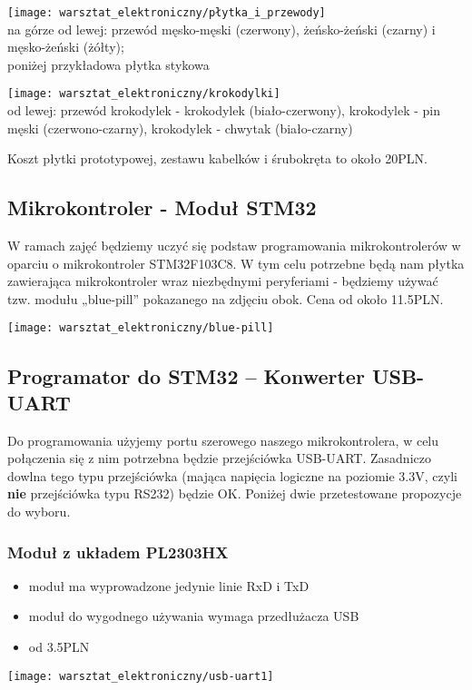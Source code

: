 \documentclass{pdfBooklets}
\newcommand\wada{\item[\textbf{\ttfamily -}]}
\newcommand\info{\item[\textbf{\ttfamily *}]}
\begin{document}
	\vspace{12pt}
		\parbox[c]{0.45\textwidth}{
			\texttt{[image: warsztat\_elektroniczny/płytka\_i\_przewody]}\footnotesize
			\\na górze od lewej: przewód męsko-męski (czerwony), żeńsko-żeński (czarny) i męsko-żeński (żółty);
			\\poniżej przykładowa płytka stykowa
		}
		\parbox[c]{0.45\textwidth}{
			\texttt{[image: warsztat\_elektroniczny/krokodylki]}\footnotesize
			\\od lewej: przewód krokodylek - krokodylek (biało-czerwony), krokodylek - pin męski (czerwono-czarny), krokodylek - chwytak (biało-czarny)
		}
	\vspace{12pt}
	
	Koszt płytki prototypowej, zestawu kabelków i śrubokręta to około 20PLN.

\subsection{Mikrokontroler - Moduł STM32}
	\parbox[c]{0.55\textwidth}{
		W ramach zajęć będziemy uczyć się podstaw programowania mikrokontrolerów w oparciu o mikrokontroler STM32F103C8.
		W tym celu potrzebne będą nam płytka zawierająca mikrokontroler wraz niezbędnymi peryferiami - będziemy używać tzw. modułu „blue-pill” pokazanego na zdjęciu obok. Cena od około 11.5PLN.
	}
	\parbox[c]{0.43\textwidth}{
		\begin{flushright} \texttt{[image: warsztat\_elektroniczny/blue-pill]} \end{flushright}
	}

\subsection{Programator do STM32 – Konwerter USB-UART}
	Do programowania użyjemy portu szerowego naszego mikrokontrolera, w celu połączenia się z nim potrzebna będzie przejściówka USB-UART. Zasadniczo dowlna tego typu przejściówka (mająca napięcia logiczne na poziomie 3.3V, czyli \textbf{nie} przejściówka typu RS232) będzie OK. Poniżej dwie przetestowane propozycje do wyboru.
	
	\subsubsection{Moduł z układem PL2303HX}
	\parbox[c]{0.55\textwidth}{
		\begin{itemize}
			\wada moduł ma wyprowadzone jedynie linie RxD i TxD
			\wada moduł do wygodnego używania wymaga przedłużacza USB
			\info od 3.5PLN
		\end{itemize}
	}
	\parbox[c]{0.43\textwidth}{
		\begin{flushright} \texttt{[image: warsztat\_elektroniczny/usb-uart1]} \end{flushright}
	}
	
\end{document}
